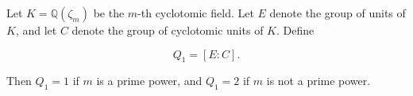 Let $K = \mathbb{Q}(\zeta_m)$ be the $m$-th cyclotomic field. Let $E$ denote the group of units of $K$, and let $C$ denote the group of cyclotomic units of $K$. Define

$$
Q_1 = [E : C].
$$

Then $Q_1 = 1$ if $m$ is a prime power, and $Q_1 = 2$ if $m$ is not a prime power.

